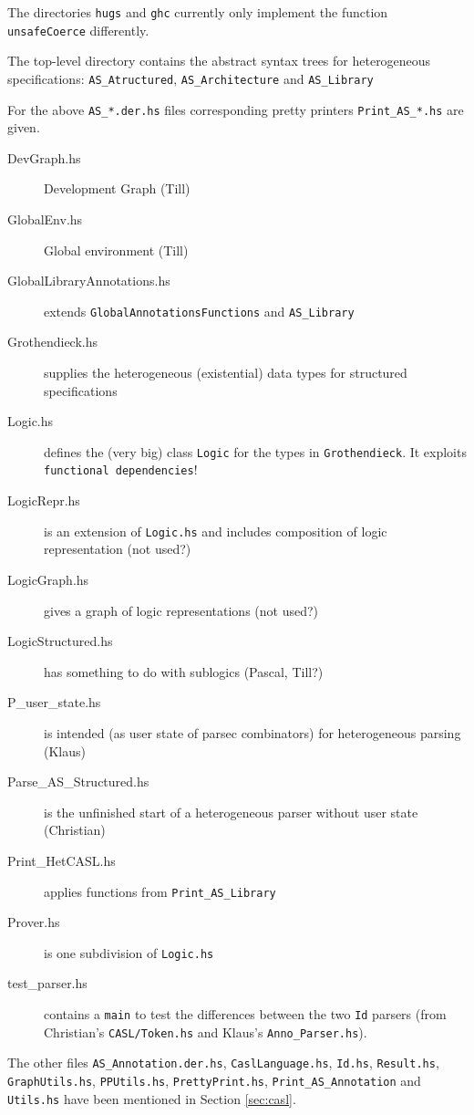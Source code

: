 \documentclass{article}
\begin{document}
The directories \texttt{hugs} and \texttt{ghc} currently only implement the function \texttt{unsafeCoerce} differently. 

The top-level directory contains the abstract syntax trees for
heterogeneous specifications: \texttt{AS\_Atructured}, \texttt{AS\_Architecture} and \texttt{AS\_Library}

For the above \texttt{AS\_*.der.hs} files corresponding pretty
printers \texttt{Print\_AS\_*.hs} are given. 

\begin{description}
\item[DevGraph.hs] Development Graph (Till)
\item[GlobalEnv.hs] Global environment (Till)
\item[GlobalLibraryAnnotations.hs] extends \texttt{GlobalAnnotationsFunctions} and \texttt{AS\_Library}
\item[Grothendieck.hs] supplies the heterogeneous (existential) data
  types for structured specifications
\item[Logic.hs] defines the (very big) class \texttt{Logic} for the
  types in \texttt{Grothendieck}. It exploits \texttt{functional
    dependencies}!
\item[LogicRepr.hs] is an extension of \texttt{Logic.hs} and includes
  composition of logic representation (not used?)
\item[LogicGraph.hs] gives a graph of logic representations (not used?)
\item[LogicStructured.hs] has something to do with sublogics (Pascal, Till?)
\item[P\_user\_state.hs] is intended (as user state of parsec
  combinators) for heterogeneous parsing (Klaus)
\item[Parse\_AS\_Structured.hs] is the unfinished start of a heterogeneous
  parser without user state (Christian)
\item[Print\_HetCASL.hs] applies functions from \texttt{Print\_AS\_Library}
\item[Prover.hs] is one subdivision of \texttt{Logic.hs}
\item[test\_parser.hs] contains a \texttt{main} to test the differences
  between the two \texttt{Id} parsers (from Christian's
  \texttt{CASL/Token.hs} and Klaus's \texttt{Anno\_Parser.hs}).
\end{description}

The other files \texttt{AS\_Annotation.der.hs},
\texttt{CaslLanguage.hs}, \texttt{Id.hs}, \texttt{Result.hs},
\texttt{GraphUtils.hs}, \texttt{PPUtils.hs}, \texttt{PrettyPrint.hs},
\texttt{Print\_AS\_Annotation} and \texttt{Utils.hs} have been mentioned in 
Section \ref{sec:casl}.
\end{document}
